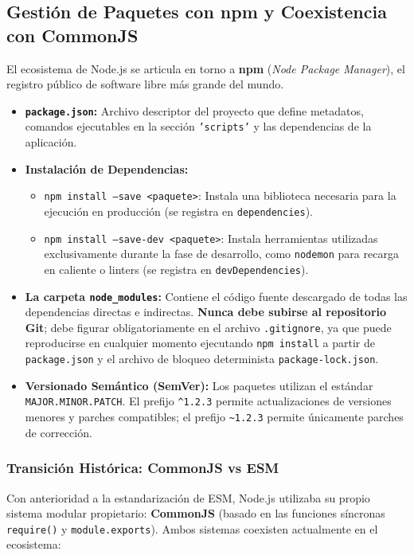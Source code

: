 \subsection{Gestión de Paquetes con npm y Coexistencia con CommonJS}

El ecosistema de Node.js se articula en torno a \textbf{npm} (\emph{Node Package Manager}), el registro público de software libre más grande del mundo.

\begin{itemize}
    \item \textbf{\texttt{package.json}:} Archivo descriptor del proyecto que define metadatos, comandos ejecutables en la sección \texttt{'scripts'} y las dependencias de la aplicación.
    \item \textbf{Instalación de Dependencias:}
    \begin{itemize}
        \item \texttt{npm install --save <paquete>}: Instala una biblioteca necesaria para la ejecución en producción (se registra en \texttt{dependencies}).
        \item \texttt{npm install --save-dev <paquete>}: Instala herramientas utilizadas exclusivamente durante la fase de desarrollo, como \texttt{nodemon} para recarga en caliente o linters (se registra en \texttt{devDependencies}).
    \end{itemize}
    \item \textbf{La carpeta \texttt{node\_modules}:} Contiene el código fuente descargado de todas las dependencias directas e indirectas. \textbf{Nunca debe subirse al repositorio Git}; debe figurar obligatoriamente en el archivo \texttt{.gitignore}, ya que puede reproducirse en cualquier momento ejecutando \texttt{npm install} a partir de \texttt{package.json} y el archivo de bloqueo determinista \texttt{package-lock.json}.
    \item \textbf{Versionado Semántico (SemVer):} Los paquetes utilizan el estándar \texttt{MAJOR.MINOR.PATCH}. El prefijo \texttt{\^{}1.2.3} permite actualizaciones de versiones menores y parches compatibles; el prefijo \texttt{\~{}1.2.3} permite únicamente parches de corrección.
\end{itemize}

\subsubsection{Transición Histórica: CommonJS vs ESM}
Con anterioridad a la estandarización de ESM, Node.js utilizaba su propio sistema modular propietario: \textbf{CommonJS} (basado en las funciones síncronas \texttt{require()} y \texttt{module.exports}). Ambos sistemas coexisten actualmente en el ecosistema:


